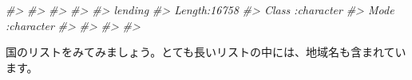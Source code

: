 \documentclass[
  xelatex, ja=standard]{bxjsbook}
\newenvironment{Shaded}{\begin{snugshade}}{\end{snugshade}}
\newcommand{\CommentTok}[1]{\textcolor[rgb]{0.56,0.35,0.01}{\textit{#1}}}
\theoremstyle{definition}
\theoremstyle{definition}
\theoremstyle{definition}
\theoremstyle{definition}
\theoremstyle{remark}
\begin{document}
\begin{Shaded}
\begin{Highlighting}[]
\CommentTok{\#\textgreater{}                                                          }
\CommentTok{\#\textgreater{}                                                          }
\CommentTok{\#\textgreater{}                                                          }
\CommentTok{\#\textgreater{}                                                          }
\CommentTok{\#\textgreater{}    lending         }
\CommentTok{\#\textgreater{}  Length:16758      }
\CommentTok{\#\textgreater{}  Class :character  }
\CommentTok{\#\textgreater{}  Mode  :character  }
\CommentTok{\#\textgreater{}                    }
\CommentTok{\#\textgreater{}                    }
\CommentTok{\#\textgreater{}                    }
\CommentTok{\#\textgreater{} }
\end{Highlighting}
\end{Shaded}

国のリストをみてみましょう。とても長いリストの中には、地域名も含まれています。
\end{document}
